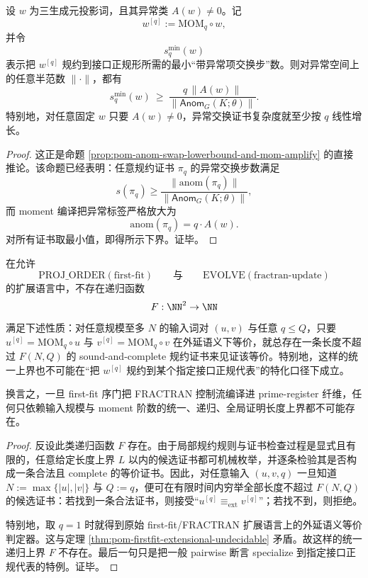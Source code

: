 \begin{theorem}\label{thm:conclusion-prime-register-mom-anomaly-certificate-linear-growth}
设 \(w\) 为三生成元投影词，且其异常类 \(A(w)\neq 0\)。记
\[
w^{[q]}:=\mathrm{MOM}_q\circ w,
\]
并令
\[
s_q^{\min}(w)
\]
表示把 \(w^{[q]}\) 规约到接口正规形所需的最小“带异常项交换步”数。则对异常空间上的任意半范数 \(\|\cdot\|\)，都有
\[
s_q^{\min}(w)\ \ge\ \frac{q\,\|A(w)\|}{\|\mathsf{Anom}_G(K;\theta)\|}.
\]
特别地，对任意固定 \(w\) 只要 \(A(w)\neq 0\)，异常交换证书复杂度就至少按 \(q\) 线性增长。
\end{theorem}
\begin{proof}
这正是命题 \ref{prop:pom-anom-swap-lowerbound-and-mom-amplify} 的直接推论。该命题已经表明：任意规约证书 \(\pi_q\) 的异常交换步数满足
\[
s(\pi_q)\ge \frac{\|\mathrm{anom}(\pi_q)\|}{\|\mathsf{Anom}_G(K;\theta)\|},
\]
而 moment 编译把异常标签严格放大为
\[
\mathrm{anom}(\pi_q)=q\cdot A(w).
\]
对所有证书取最小值，即得所示下界。证毕。
\end{proof}

\begin{theorem}\label{thm:conclusion-firstfit-no-recursive-uniform-proof-bound}
在允许
\[
\mathrm{PROJ\_ORDER}(\mathrm{first\mbox{-}fit})
\qquad\text{与}\qquad
\mathrm{EVOLVE}(\mathrm{fractran\mbox{-}update})
\]
的扩展语言中，不存在递归函数
\[
F:\NN^2\to \NN
\]
满足下述性质：对任意规模至多 \(N\) 的输入词对 \((u,v)\) 与任意 \(q\le Q\)，只要 \(u^{[q]}=\mathrm{MOM}_q\circ u\) 与 \(v^{[q]}=\mathrm{MOM}_q\circ v\) 在外延语义下等价，就总存在一条长度不超过 \(F(N,Q)\) 的 sound-and-complete 规约证书来见证该等价。特别地，这样的统一上界也不可能在“把 \(w^{[q]}\) 规约到某个指定接口正规代表”的特化口径下成立。

换言之，一旦 first-fit 序门把 FRACTRAN 控制流编译进 prime-register 纤维，任何只依赖输入规模与 moment 阶数的统一、递归、全局证明长度上界都不可能存在。
\end{theorem}
\begin{proof}
反设此类递归函数 \(F\) 存在。由于局部规约规则与证书检查过程是显式且有限的，任意给定长度上界 \(L\) 以内的候选证书都可机械枚举，并逐条检验其是否构成一条合法且 complete 的等价证书。因此，对任意输入 \((u,v,q)\) 一旦知道 \(N:=\max\{|u|,|v|\}\) 与 \(Q:=q\)，便可在有限时间内穷举全部长度不超过 \(F(N,Q)\) 的候选证书：若找到一条合法证书，则接受“\(u^{[q]}\equiv_{\mathrm{ext}} v^{[q]}\)”；若找不到，则拒绝。

特别地，取 \(q=1\) 时就得到原始 first-fit/FRACTRAN 扩展语言上的外延语义等价判定器。这与定理 \ref{thm:pom-firstfit-extensional-undecidable} 矛盾。故这样的统一递归上界 \(F\) 不存在。最后一句只是把一般 pairwise 断言 specialize 到指定接口正规代表的特例。证毕。
\end{proof}

